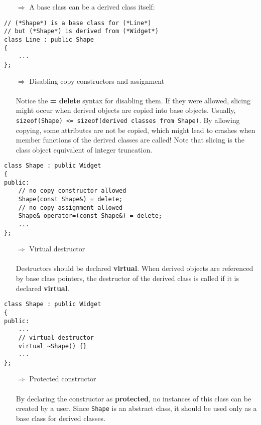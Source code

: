 \documentclass[10pt]{article}
\begin{document}
\begin{enumerate}
\item[$\Rightarrow$] A base class can be a derived class itself:
\end{enumerate}
\begin{lstlisting}
// (*Shape*) is a base class for (*Line*)
// but (*Shape*) is derived from (*Widget*)
class Line : public Shape
{
    ...
};
\end{lstlisting}
\begin{enumerate}
\item[$\Rightarrow$] Disabling copy constructors and assignment\\ \\ Notice the \textbf{= delete}  syntax for disabling them. If they were allowed, slicing might occur when derived objects are copied into base objects. Usually, \texttt{sizeof(Shape) <= sizeof(derived classes from Shape)}. By allowing copying, some attributes are not be copied, which might lead to crashes when member functions of the derived classes are called! Note that slicing is the class object equivalent of integer truncation.
\end{enumerate}
\begin{lstlisting}
class Shape : public Widget
{
public:
    // no copy constructor allowed
    Shape(const Shape&) = delete;
    // no copy assignment allowed
    Shape& operator=(const Shape&) = delete;
    ...
};
\end{lstlisting}
\begin{enumerate}
\item[$\Rightarrow$] Virtual destructor\\ \\ Destructors should be declared \textbf{virtual}. When derived
objects are referenced by base class pointers, the destructor of the derived class is called if it is declared \textbf{virtual}.
\end{enumerate}
\begin{lstlisting}
class Shape : public Widget
{
public:
    ...
    // virtual destructor
    virtual ~Shape() {}
    ...
};
\end{lstlisting}
\begin{enumerate}
\item[$\Rightarrow$] Protected constructor\\ \\ By declaring the constructor as \textbf{protected}, no instances of this class can be created by a user. Since \texttt{Shape} is an abstract class, it should be used only as a base class for derived classes.
\end{enumerate}
\end{document}
